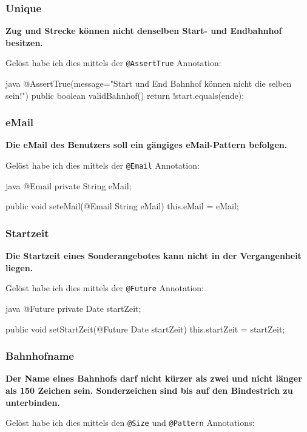 \subsubsection{Unique}
\textbf{Zug und Strecke können nicht denselben Start- und Endbahnhof besitzen.}

Gelöst habe ich dies mittels der \texttt{@AssertTrue} Annotation:

\begin{code}{java}
@AssertTrue(message="Start und End Bahnhof können nicht die selben sein!")
public boolean validBahnhof() {
    return !start.equals(ende);
}
\end{code}

\subsubsection{eMail}
\textbf{Die eMail des Benutzers soll ein gängiges eMail-Pattern befolgen.}

Gelöst habe ich dies mittels der \texttt{@Email} Annotation:

\begin{code}{java}
@Email
private String eMail;

public void seteMail(@Email String eMail) {
    this.eMail = eMail;
}
\end{code}

\subsubsection{Startzeit}
\textbf{Die Startzeit eines Sonderangebotes kann nicht in der Vergangenheit liegen.}

Gelöst habe ich dies mittels der \texttt{@Future} Annotation:

\begin{code}{java}
@Future
private Date startZeit;

public void setStartZeit(@Future Date startZeit) {
    this.startZeit = startZeit;
}
\end{code}

\subsubsection{Bahnhofname}
\textbf{Der Name eines Bahnhofs darf nicht kürzer als zwei und nicht länger als 150 Zeichen sein. Sonderzeichen sind bis auf den Bindestrich zu unterbinden.}

Gelöst habe ich dies mittels den \texttt{@Size} und \texttt{@Pattern} Annotations:

